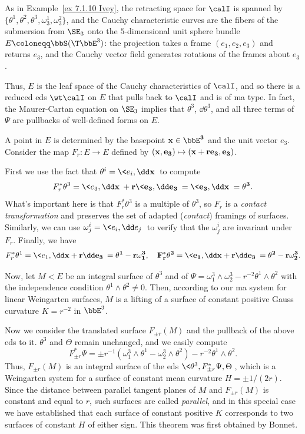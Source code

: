 As in Example~\ref{ex 7.1.10 Ivey}, the retracting space for $\calI$ is spanned by $\{\theta^1,\theta^2,\theta^3,\omega_3^1,\omega_3^2\}$, and the Cauchy characteristic curves are the fibers of the submersion from $\SE_3$ onto the $5$-dimensional unit sphere bundle $E\coloneqq \bbS(\T\bbE^3)$: the projection takes a frame $(e_1,e_2,e_3)$ and returns $e_3$, and the Cauchy vector field generates rotations of the frames about $e_3$.

Thus, $E$ is the leaf space of the Cauchy characteristics of $\calI$, and so there is a reduced \gls{eds} $\wt\calI$ on $E$ that pulls back to $\calI$ and is of \gls{ma} type. In fact, the Maurer-Cartan equation on $\SE_3$ implies that $\theta^3$, $\dd\theta^3$, and all three terms of $\Psi$ are pullbacks of well-defined forms on $E$.

\begin{example}\label{xca 7.4.15 Ivey}
    A point in $E$ is determined by the basepoint $\bf{x}\in\bbE^3$ and the unit vector $e_3$. Consider the map $F_r:E\to E$ defined by $(\bf{x},e_3)\mapsto (\bf{x}+re_3,e_3)$.

    First we use the fact that $\theta^i=\<e_i,\dd \bf{x}\>$ to compute 
    \[F_r^\ast\theta^3=\<e_3,\dd \bf{x}\>+r\<e_3,\dd e_3\>=\<e_3,\dd\bf{x}\>=\theta^3.\]
    What's important here is that $F_r^\ast\theta^3$ is a multiple of $\theta^3$, so $F_r$ is a \emph{contact transformation} and preserves the set of adapted (\emph{contact}) framings of surfaces. Similarly, we can use $\omega^i_j=\<e_i,\dd e_j\>$ to verify that the $\omega^i_j$ are invariant under $F_r$. Finally, we have 
    \[F_r^\ast\theta^1=\<e_1,\dd\bf{x}+r\dd e_3\>=\theta^1-r\omega^3_1,\quad F_r^\ast\theta^2=\<e_1,\dd\bf{x}+r\dd e_3\>=\theta^2-r\omega^3_2.\]

    Now, let $M< E$ be an integral surface of $\theta^3$ and of $\Psi=\omega_1^3\wedge\omega_2^3-r^{-2}\theta^1\wedge\theta^2$ with the independence condition $\theta^1\wedge\theta^2\neq 0$. Then, according to our \gls{ma} system for linear Weingarten surfaces, $M$ is a lifting of a surface of constant positive Gauss curvature $K=r^{-2}$ in $\bbE^3$.

    Now we consider the translated surface $F_{\pm r}(M)$ and the pullback of the above \gls{eds} to it. $\theta^3$ and $\Theta$ remain unchanged, and we easily compute 
    \[F_{\pm r}^\ast \Psi=\pm r^{-1}(\omega^3_1\wedge\theta^1-\omega^3_2\wedge\theta^2)-r^{-2}\theta^1\wedge\theta^2.\]
    Thus, $F_{\pm r}(M)$ is an integral surface of the \gls{eds} $ \<\theta^3,F_{\pm r}^\ast\Psi,\Theta\>$, which is a Weingarten system for a surface of constant mean curvature $H=\pm 1/(2r)$. Since the distance between parallel tangent planes of $M$ and $F_{\pm r}(M)$ is constant and equal to $r$, such surfaces are called \emph{parallel}, and in this special case we have established that each surface of constant positive $K$ corresponds to two surfaces of constant $H$ of either sign. This theorem was first obtained by Bonnet.
\end{example}


